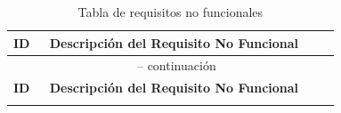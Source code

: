 \begin{longtable}{|p{0.1\linewidth}|p{0.8\linewidth}|}
	\caption{Tabla de requisitos no funcionales}\label{tab:non-functional} \\
	\hline
	\textbf{ID} & \textbf{Descripción del Requisito No Funcional}                                                                           \\
	\hline
	\endfirsthead

	\multicolumn{2}{c}{\tablename\ \thetable\ -- continuación}                                                                              \\
	\hline
	\textbf{ID} & \textbf{Descripción del Requisito No Funcional}                                                                           \\
	\hline
	\endhead

	\hline
	\endfoot

	\hline
	\endlastfoot


\end{longtable}
